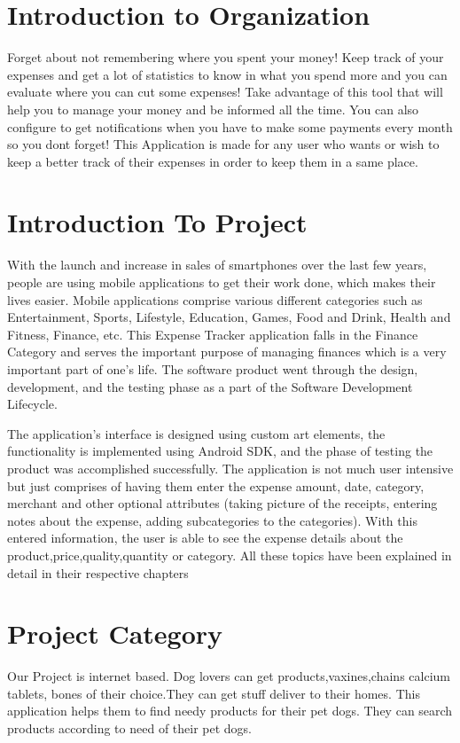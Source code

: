 \section{Introduction to Organization}

Forget about not remembering where you spent your money! Keep track of your expenses and get
a lot of statistics to know in what you spend more and you can evaluate where you can cut some expenses! Take advantage of this tool that will help you to manage your money and be informed
all the time. You can also configure to get notifications when you have to make some payments
every month so you dont forget! This Application is made for any user who wants or wish to keep a better track of their expenses in order to keep them in a same place.
\section{Introduction To Project} 
With the launch and increase in sales of smartphones over the last few years, people are using mobile applications to get their work done, which makes their lives easier. Mobile applications comprise various different categories such as Entertainment, Sports, Lifestyle, Education, Games, Food and Drink, Health and Fitness, Finance, etc. This Expense Tracker application falls in the Finance Category and serves the important purpose of managing finances which is a very important part of one’s life.  The software product went through the design, development, and the testing phase as a part of the Software Development Lifecycle. 

The application’s interface is designed using custom art elements, the functionality is implemented using Android SDK, and the phase of testing the product was accomplished successfully. The application is not much user intensive but just comprises of having them enter the expense amount, date, category, merchant and other optional attributes (taking picture of the receipts, entering notes about the expense, adding subcategories to the categories). With this entered information, the user is able to see the expense details about the product,price,quality,quantity or category. All these topics have been explained in detail in their respective chapters

\section{Project Category}
Our Project is internet based.
Dog lovers can get products,vaxines,chains calcium tablets, bones of their choice.They can get stuff deliver to their homes. This application helps them to find needy products for their pet dogs. They can search products according to need of their pet dogs.


